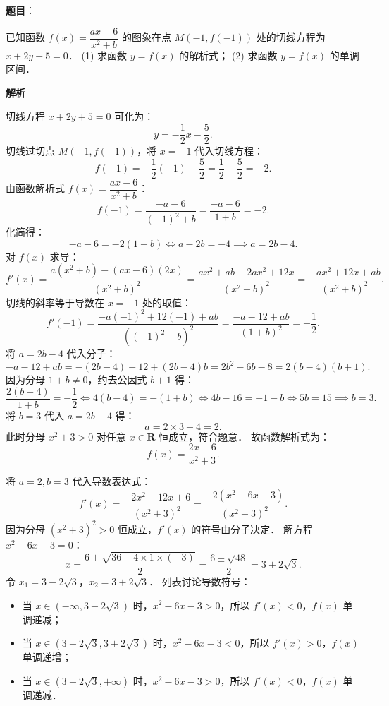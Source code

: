 \begin{answer}

\textbf{题目}：

已知函数 $f(x) = \dfrac{ax - 6}{x^2 + b}$ 的图象在点 $M(-1, f(-1))$ 处的切线方程为 $x + 2y + 5 = 0$．
(1) 求函数 $y = f(x)$ 的解析式；
(2) 求函数 $y = f(x)$ 的单调区间．

\textbf{解析}


切线方程 $x + 2y + 5 = 0$ 可化为：
\nopagebreak[4]
\[
y = -\frac{1}{2}x - \frac{5}{2}.
\]
切线过切点 $M(-1, f(-1))$，将 $x = -1$ 代入切线方程：
\nopagebreak[4]
\[
f(-1) = -\frac{1}{2}(-1) - \frac{5}{2} = \frac{1}{2} - \frac{5}{2} = -2.
\]
由函数解析式 $f(x) = \dfrac{ax - 6}{x^2 + b}$：
\nopagebreak[4]
\[
f(-1) = \frac{-a - 6}{(-1)^2 + b} = \frac{-a - 6}{1 + b} = -2.
\]
化简得：
\nopagebreak[4]
\[
-a - 6 = -2(1 + b) \iff a - 2b = -4 \implies a = 2b - 4.
\]
对 $f(x)$ 求导：
\nopagebreak[4]
\[
f'(x) = \frac{a(x^2 + b) - (ax - 6)(2x)}{(x^2 + b)^2} = \frac{ax^2 + ab - 2ax^2 + 12x}{(x^2 + b)^2} = \frac{-ax^2 + 12x + ab}{(x^2 + b)^2}.
\]
切线的斜率等于导数在 $x = -1$ 处的取值：
\nopagebreak[4]
\[
f'(-1) = \frac{-a(-1)^2 + 12(-1) + ab}{((-1)^2 + b)^2} = \frac{-a - 12 + ab}{(1 + b)^2} = -\frac{1}{2}.
\]
将 $a = 2b - 4$ 代入分子：
\nopagebreak[4]
\[
-a - 12 + ab = -(2b - 4) - 12 + (2b - 4)b = 2b^2 - 6b - 8 = 2(b - 4)(b + 1).
\]
因为分母 $1 + b \neq 0$，约去公因式 $b + 1$ 得：
\nopagebreak[4]
\[
\frac{2(b - 4)}{1 + b} = -\frac{1}{2} \iff 4(b - 4) = -(1 + b) \iff 4b - 16 = -1 - b \iff 5b = 15 \implies b = 3.
\]
将 $b = 3$ 代入 $a = 2b - 4$ 得：
\nopagebreak[4]
\[
a = 2 \times 3 - 4 = 2.
\]
此时分母 $x^2 + 3 > 0$ 对任意 $x \in \mathbf{R}$ 恒成立，符合题意．
故函数解析式为：
\nopagebreak[4]
\[
f(x) = \frac{2x - 6}{x^2 + 3}.
\]


将 $a = 2, b = 3$ 代入导数表达式：
\nopagebreak[4]
\[
f'(x) = \frac{-2x^2 + 12x + 6}{(x^2 + 3)^2} = \frac{-2(x^2 - 6x - 3)}{(x^2 + 3)^2}.
\]
因为分母 $(x^2 + 3)^2 > 0$ 恒成立，$f'(x)$ 的符号由分子决定．
解方程 $x^2 - 6x - 3 = 0$：
\nopagebreak[4]
\[
x = \frac{6 \pm \sqrt{36 - 4 \times 1 \times (-3)}}{2} = \frac{6 \pm \sqrt{48}}{2} = 3 \pm 2\sqrt{3}.
\]
令 $x_1 = 3 - 2\sqrt{3}$，$x_2 = 3 + 2\sqrt{3}$．
列表讨论导数符号：
\begin{itemize}
\item 当 $x \in (-\infty, 3 - 2\sqrt{3})$ 时，$x^2 - 6x - 3 > 0$，所以 $f'(x) < 0$，$f(x)$ 单调递减；
\item 当 $x \in (3 - 2\sqrt{3}, 3 + 2\sqrt{3})$ 时，$x^2 - 6x - 3 < 0$，所以 $f'(x) > 0$，$f(x)$ 单调递增；
\item 当 $x \in (3 + 2\sqrt{3}, +\infty)$ 时，$x^2 - 6x - 3 > 0$，所以 $f'(x) < 0$，$f(x)$ 单调递减．
\end{itemize}


\end{answer}
